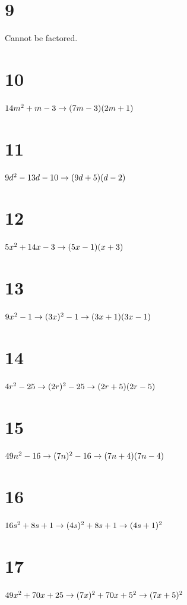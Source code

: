 \documentclass{article}
\theoremstyle{definition}
\begin{document}
\section*{9}
Cannot be factored.

\section*{10}
$14m^2+m-3\newline\rightarrow (7m-3)(2m+1)$

\section*{11}
$9d^2-13d-10\newline\rightarrow (9d+5)(d-2)$

\section*{12}
$5x^2+14x-3\newline\rightarrow (5x-1)(x+3)$

\section*{13}
$9x^2-1\newline\rightarrow (3x)^2-1\newline\rightarrow (3x+1)(3x-1)$

\section*{14}
$4r^2-25\newline\rightarrow (2r)^2-25\newline\rightarrow (2r+5)(2r-5)$

\section*{15}
$49n^2-16\newline\rightarrow (7n)^2-16\newline\rightarrow (7n+4)(7n-4)$

\section*{16}
$16s^2+8s+1\newline\rightarrow (4s)^2+8s+1\newline\rightarrow (4s+1)^2$

\section*{17}
$49x^2+70x+25\newline\rightarrow (7x)^2+70x+5^2\newline\rightarrow (7x+5)^2$
\end{document}
